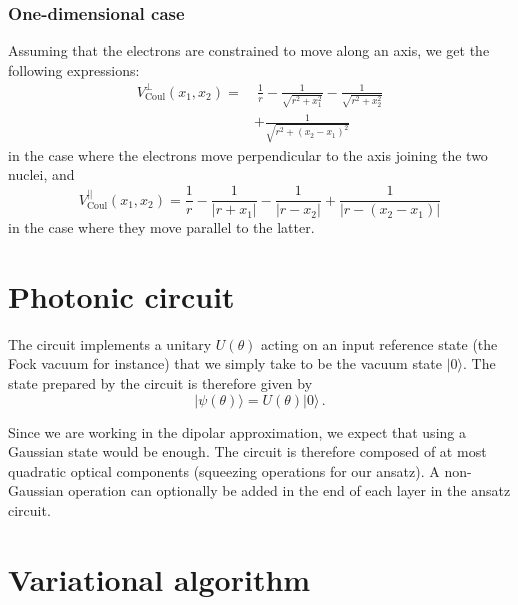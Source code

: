 \documentclass[reprint, amsmath, amssymb, aps]{revtex4-2}
\begin{document}
            \subsubsection{One-dimensional case}

                Assuming that the electrons are constrained to move along an axis, we get the following expressions:
                \begin{equation}
                \begin{split}
                    V_\text{Coul}^\perp(x_1, x_2) = &\ \frac{1}{r} - \frac{1}{\sqrt{r^2+x_1^2}} - \frac{1}{\sqrt{r^2+x_2^2}} \\
                    &+\frac{1}{\sqrt{r^2 + (x_2-x_1)^2}}
                \end{split}
                \end{equation}
                in the case where the electrons move perpendicular to the axis joining the two nuclei, and
                \begin{equation}
                    V_\text{Coul}^{||}(x_1, x_2) = \frac{1}{r} - \frac{1}{|r+x_1|} - \frac{1}{|r-x_2|} + \frac{1}{|r-(x_2-x_1)|}
                \end{equation}
                in the case where they move parallel to the latter.

\section{Photonic circuit}

    The circuit implements a unitary $U(\theta)$ acting on an input reference state (the Fock vacuum for instance) that we simply take to be the vacuum state $|0\rangle$. The state prepared by the circuit is therefore given by
    \begin{equation}
        |\psi(\theta)\rangle = U(\theta)|0\rangle\,.
    \end{equation}

    Since we are working in the dipolar approximation, we expect that using a Gaussian state would be enough. The circuit is therefore composed of at most quadratic optical components (squeezing operations for our ansatz). A non-Gaussian operation can optionally be added in the end of each layer in the ansatz circuit.

\section{Variational algorithm}
\end{document}
